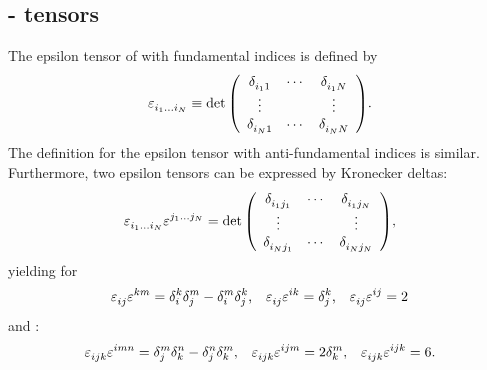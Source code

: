 \subsection{\eps{} - tensors}
The epsilon tensor of  with fundamental indices is defined by
\begin{equation}
	\begin{aligned}
		\tensor{\eps}{_{i_{1} \ldots i_{N}}} \equiv
		\det{
			\left(
			\begin{array}{ccc}
				\tensor*{\delta}{_{i_{1} 1}} & \cdots & \tensor*{\delta}{_{i_{1} N}} \\
				\vdots & & \vdots \\
				\tensor*{\delta}{_{i_{N} 1}} & \cdots & \tensor*{\delta}{_{i_{N} N}}
			\end{array}
			\right)
		}
		\text{.}
	\end{aligned}
\end{equation}
The definition for the epsilon tensor with anti-fundamental indices is similar. Furthermore, two epsilon tensors can be expressed by Kronecker deltas:
\begin{equation}
	\begin{aligned}
		\tensor{\eps}{_{i_{1} \ldots i_{N}}} \tensor{\eps}{^{j_{1} \ldots j_{N}}}
		=
		\det{
			\left(
			\begin{array}{ccc}
				\tensor*{\delta}{_{i_{1} j_{1}}} & \cdots & \tensor*{\delta}{_{i_{1} j_{N}}} \\
				\vdots & & \vdots \\
				\tensor*{\delta}{_{i_{N} j_{1}}} & \cdots & \tensor*{\delta}{_{i_{N} j_{N}}}
			\end{array}
			\right)
		}
		\text{,}
	\end{aligned}
\end{equation}
yielding for 
\begin{equation}
	\begin{aligned}
		\tensor{\eps}{_{i j}} \tensor{\eps}{^{k m}}
		= \tensor*{\delta}{_{i}^{k}} \tensor*{\delta}{_{j}^{m}}
		- \tensor*{\delta}{_{i}^{m}} \tensor*{\delta}{_{j}^{k}}
		\text{,} \quad
		\tensor{\eps}{_{i j}} \tensor{\eps}{^{i k}}
		= \tensor*{\delta}{_{j}^{k}}
		\text{,} \quad
		\tensor{\eps}{_{i j}} \tensor{\eps}{^{i j}}
		= 2
	\end{aligned} \label{eq:epsilonSU2}
\end{equation}
and :
\begin{equation}
	\begin{aligned}
		\tensor{\eps}{_{i j k}} \tensor{\eps}{^{i m n}}
		= \tensor*{\delta}{_{j}^{m}} \tensor*{\delta}{_{k}^{n}}
		- \tensor*{\delta}{_{j}^{n}} \tensor*{\delta}{_{k}^{m}}
		\text{,} \quad
		\tensor{\eps}{_{i j k}} \tensor{\eps}{^{i j m}}
		= 2 \tensor*{\delta}{_{k}^{m}}
		\text{,} \quad
		\tensor{\eps}{_{i j k}} \tensor{\eps}{^{i j k}}
		= 6
		\text{.}
	\end{aligned} \label{eq:epsilonSU3}
\end{equation}
